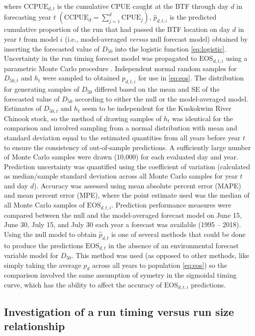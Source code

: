 \documentclass[12pt,]{book}
\theoremstyle{definition}
\theoremstyle{definition}
\theoremstyle{definition}
\theoremstyle{remark}
\begin{document}
\noindent
where \(\text{CCPUE}_{d,t}\) is the cumulative CPUE caught at the BTF
through day \(d\) in forecasting year \(t\)
\(\left(\text{CCPUE}_d = \sum_{j=1}^{d} \text{CPUE}_j \right)\),
\(\hat{p}_{d,t,i}\) is the predicted cumulative proportion of the run
that had passed the BTF location on day \(d\) in year \(t\) from model
\(i\) (i.e., model-averaged \emph{versus} null forecast model) obtained
by inserting the forecasted value of \(D_{50}\) into the logistic
function \eqref{eq:logistic}. Uncertainty in the run timing forecast model
was propagated to \(\text{EOS}_{d,t,i}\) using a parametric Monte Carlo
procedure \citep{bolker-2008}. Independent normal random samples for
\(D_{50,t}\) and \(h_t\) were sampled to obtained \(p_{d,t,i}\) for use
in \eqref{eq:eos}. The distribution for generating samples of \(D_{50}\)
differed based on the mean and SE of the forecasted value of \(D_{50}\)
according to either the null or the model-averaged model. Estimates of
\(D_{50,t}\) and \(h_t\) seem to be independent for the Kuskokwim River
Chinook stock, so the method of drawing samples of \(h_t\) was identical
for the comparison and involved sampling from a normal distribution with
mean and standard deviation equal to the estimated quantities from all
years before year \(t\) to ensure the consistency of out-of-sample
predictions. A sufficiently large number of Monte Carlo samples were
drawn (10,000) for each evaluated day and year. Prediction uncertainty
was quantified using the coefficient of variation (calculated as
median/sample standard deviation across all Monte Carlo samples for year
\(t\) and day \(d\)). Accuracy was assessed using mean absolute percent
error (MAPE) and mean percent error (MPE), where the point estimate used
was the median of all Monte Carlo samples of \(\text{EOS}_{d,t,i}\).
Prediction performance measures were compared between the null and the
model-averaged forecast model on June 15, June 30, July 15, and July 30
each year a forecast was available (1995 -- 2018). Using the null model
to obtain \(\hat{p}_{d,t}\) is one of several methods that could be done
to produce the predictions \(\text{EOS}_{d,t}\) in the absence of an
environmental forecast variable model for \(D_{50}\). This method was
used (as opposed to other methods, like simply taking the average
\(p_d\) across all years to population \eqref{eq:eos}) so the comparison
involved the same assumption of symetry in the sigmoidal timing curve,
which has the ability to affect the accuracy of \(\text{EOS}_{d,t,i}\)
predictions.

\subsection{Investigation of a run timing versus run size
relationship}\label{investigation-of-a-run-timing-versus-run-size-relationship}
\end{document}
